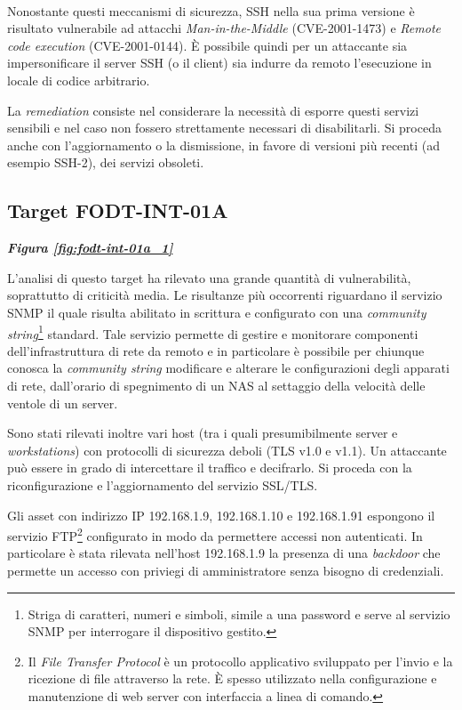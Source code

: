 \documentclass[target=bach,aauheader=]{thud}
\begin{document}
\\ Nonostante questi meccanismi di sicurezza, SSH nella sua prima versione è risultato vulnerabile ad attacchi \textit{Man-in-the-Middle} (CVE-2001-1473) e \textit{Remote code execution} (CVE-2001-0144). È possibile quindi per un attaccante sia impersonificare il server SSH (o il client) sia indurre da remoto l'esecuzione in locale di codice arbitrario. 


La \textit{remediation} consiste nel considerare la necessità di esporre questi servizi sensibili e nel caso non fossero strettamente necessari di disabilitarli. Si proceda anche con l’aggiornamento o la dismissione, in favore di versioni più recenti (ad esempio SSH-2), dei servizi obsoleti.

\subsection{Target FODT-INT-01A} \textbf{\textit{Figura \ref{fig:fodt-int-01a_1}}}

L’analisi di questo target ha rilevato una grande quantità di vulnerabilità, soprattutto di criticità media.
Le risultanze più occorrenti riguardano il servizio SNMP il quale risulta abilitato in scrittura e configurato con una \textit{community string}\footnote{Striga di caratteri, numeri e simboli, simile a una password e serve al servizio SNMP per interrogare il dispositivo gestito.} standard. Tale servizio permette di gestire e monitorare componenti dell’infrastruttura di rete da remoto e in particolare è possibile per chiunque conosca la \textit{community string} modificare e alterare le configurazioni degli apparati di rete, dall'orario di spegnimento di un NAS al settaggio della velocità delle ventole di un server.

Sono stati rilevati inoltre vari host (tra i quali presumibilmente server e \textit{workstations}) con protocolli di sicurezza deboli (TLS v1.0 e v1.1). Un attaccante può essere in grado di intercettare il traffico e decifrarlo. Si proceda con la riconfigurazione e l’aggiornamento del servizio SSL/TLS.

Gli asset con indirizzo IP 192.168.1.9, 192.168.1.10 e 192.168.1.91 espongono il servizio FTP\footnote{Il \textit{File Transfer Protocol} è un protocollo applicativo sviluppato per l'invio e la ricezione di file attraverso la rete. È spesso utilizzato nella configurazione e manutenzione di web server con interfaccia a linea di comando.} configurato in modo da permettere accessi non autenticati. In particolare è stata rilevata nell'host 192.168.1.9 la presenza di una \textit{backdoor} che permette un accesso con priviegi di amministratore senza bisogno di credenziali.
\end{document}

